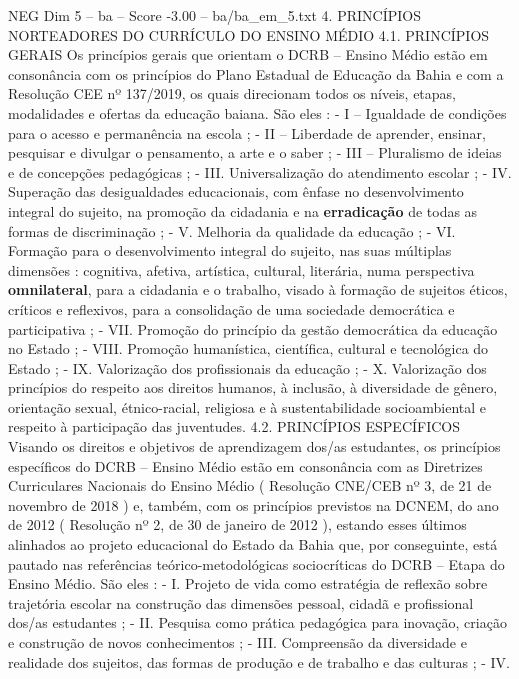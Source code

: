 \begin{textsample}{NEG Dim 5 – ba – Score -3.00 – ba/ba\_em\_5.txt}  \label{ex:f5_neg_010}
4.
PRINCÍPIOS NORTEADORES DO CURRÍCULO DO ENSINO MÉDIO 4.1.
PRINCÍPIOS GERAIS Os princípios gerais que orientam o DCRB – Ensino Médio estão em consonância com os princípios do Plano Estadual de Educação da Bahia e com a Resolução CEE nº 137/2019, os quais direcionam todos os níveis, etapas, modalidades e ofertas da educação baiana.
São eles : - I – Igualdade de condições para o acesso e permanência na escola ; - II – Liberdade de aprender, ensinar, pesquisar e divulgar o pensamento, a arte e o saber ; - III – Pluralismo de ideias e de concepções pedagógicas ; - III.
Universalização do atendimento escolar ; - IV.
Superação das desigualdades educacionais, com ênfase no desenvolvimento integral do sujeito, na promoção da cidadania e na \textbf{erradicação} de todas as formas de discriminação ; - V.
Melhoria da qualidade da educação ; - VI.
Formação para o desenvolvimento integral do sujeito, nas suas múltiplas dimensões : cognitiva, afetiva, artística, cultural, literária, numa perspectiva \textbf{omnilateral}, para a cidadania e o trabalho, visado à formação de sujeitos éticos, críticos e reflexivos, para a consolidação de uma sociedade democrática e participativa ; - VII.
Promoção do princípio da gestão democrática da educação no Estado ; - VIII.
Promoção humanística, científica, cultural e tecnológica do Estado ; - IX.
Valorização dos profissionais da educação ; - X.
Valorização dos princípios do respeito aos direitos humanos, à inclusão, à diversidade de gênero, orientação sexual, étnico-racial, religiosa e à sustentabilidade socioambiental e respeito à participação das juventudes. 4.2.
PRINCÍPIOS ESPECÍFICOS Visando os direitos e objetivos de aprendizagem dos/as estudantes, os princípios específicos do DCRB – Ensino Médio estão em consonância com as Diretrizes Curriculares Nacionais do Ensino Médio ( Resolução CNE/CEB nº 3, de 21 de novembro de 2018 ) e, também, com os princípios previstos na DCNEM, do ano de 2012 ( Resolução nº 2, de 30 de janeiro de 2012 ), estando esses últimos alinhados ao projeto educacional do Estado da Bahia que, por conseguinte, está pautado nas referências teórico-metodológicas sociocríticas do DCRB – Etapa do Ensino Médio.
São eles : - I.
Projeto de vida como estratégia de reflexão sobre trajetória escolar na construção das dimensões pessoal, cidadã e profissional dos/as estudantes ; - II.
Pesquisa como prática pedagógica para inovação, criação e construção de novos conhecimentos ; - III.
Compreensão da diversidade e realidade dos sujeitos, das formas de produção e de trabalho e das culturas ; - IV.

\end{textsample}
